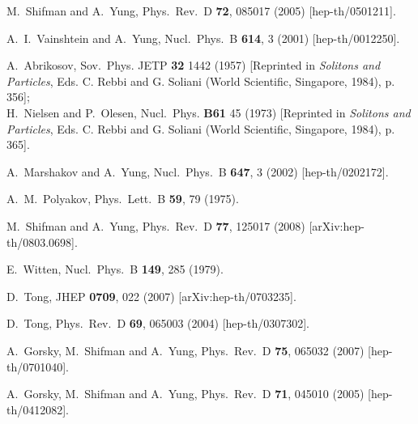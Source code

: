 \documentclass[12pt]{article}
\begin{document}
\begin{thebibliography}{99}
  
  
  
  



M.~Shifman and A.~Yung,
Phys.\ Rev.\ D {\bf 72}, 085017 (2005)
[hep-th/0501211].


A.~I.~Vainshtein and A.~Yung,
Nucl.\ Phys.\ B {\bf 614}, 3 (2001)
[hep-th/0012250].

A.~Abrikosov, Sov.~Phys. JETP {\bf32} 1442  (1957)
[Reprinted in {\em Solitons and Particles}, Eds. C. Rebbi and G. Soliani
(World Scientific, Singapore, 1984), p. 356];\\
H.~Nielsen and P.~Olesen, Nucl.~Phys. {\bf B61} 45 (1973)
[Reprinted in {\em Solitons and Particles}, Eds. C. Rebbi and G. Soliani
(World Scientific, Singapore, 1984), p. 365].


A.~Marshakov and A.~Yung,
Nucl.\ Phys.\ B {\bf 647}, 3 (2002)
[hep-th/0202172].

A.~M.~Polyakov,
Phys.\ Lett.\ B {\bf 59}, 79 (1975).

M.~Shifman and A.~Yung,
Phys.\ Rev.\ D {\bf 77}, 125017 (2008)
[arXiv:hep-th/0803.0698].

E.~Witten,
Nucl.\ Phys.\ B {\bf 149}, 285 (1979).


  D.~Tong,
  JHEP {\bf 0709}, 022 (2007)
  [arXiv:hep-th/0703235].


D.~Tong,
Phys.\ Rev.\ D {\bf 69}, 065003 (2004)
[hep-th/0307302].

A.~Gorsky, M.~Shifman and A.~Yung,
Phys.\ Rev.\  D {\bf 75}, 065032 (2007)
  [hep-th/0701040].


A.~Gorsky, M.~Shifman and A.~Yung,
  Phys.\ Rev.\ D {\bf 71}, 045010 (2005)
  [hep-th/0412082].

\end{thebibliography}
\end{document}
